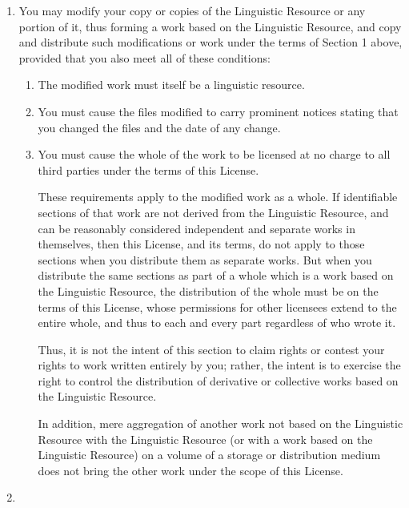 \begin{enumerate}
\item

You may modify your copy or copies of the Linguistic Resource or any portion of it, 
thus forming a work based on the Linguistic Resource, and copy and distribute such 
modifications or work under the terms of Section 1 above, provided that you also meet 
all of these conditions:

\begin{enumerate}

\item 

The modified work must itself be a linguistic resource.

\item

You must cause the files modified to carry prominent notices stating that you changed the 
files and the date of any change.

\item

You must cause the whole of the work to be licensed at no charge to all third parties under the 
terms of this License.

These requirements apply to the modified work as a whole. If identifiable sections of that work are 
not derived from the Linguistic Resource, and can be reasonably considered independent and separate 
works in themselves, then this License, and its terms, do not apply to those sections when you 
distribute them as separate works. But when you distribute the same sections as part of a whole 
which is a work based on the Linguistic Resource, the distribution of the whole must be on the terms 
of this License, whose permissions for other licensees extend to the entire whole, and thus to each 
and every part regardless of who wrote it.

Thus, it is not the intent of this section to claim rights or contest your rights to work written 
entirely by you; rather, the intent is to exercise the right to control the distribution of 
derivative or collective works based on the Linguistic Resource.

In addition, mere aggregation of another work not based on the Linguistic Resource with the 
Linguistic Resource (or with a work based on the Linguistic Resource) on a volume of a storage 
or distribution medium does not bring the other work under the scope of this License. 

\end{enumerate}


\item


\end{enumerate}
